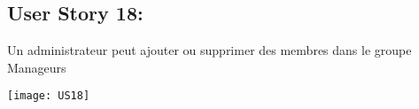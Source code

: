 \newpage{}
\subsection{User Story 18:}
Un administrateur peut ajouter ou supprimer des membres dans le groupe Manageurs


  \begin{center}
        \texttt{[image: US18]}
  \end{center}